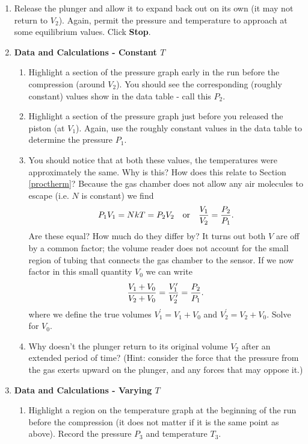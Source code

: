 \begin{enumerate}
	\item Release the plunger and allow it to expand back out on its own (it may not return to $V_{2}$).  Again, permit the pressure and temperature to approach at some equilibrium values.  Click \textbf{Stop}.
	\item \textbf{Data and Calculations - Constant $T$}
	\begin{enumerate}
		\item Highlight a section of the pressure graph early in the run before the compression (around $V_{2}$).  You should see the corresponding (roughly constant) values show in the data table - call this $P_{2}$.
		\item Highlight a section of the pressure graph just before you released the piston (at $V_{1}$).  Again, use the roughly constant values in the data table to determine the pressure $P_{1}$.
		\item You should notice that at both these values, the temperatures were approximately the same.  Why is this?  How does this relate to Section \ref{proctherm}?  Because the gas chamber does not allow any air molecules to escape (i.e. $N$ is constant) we find
		\begin{equation}
			P_{1}V_{1} = NkT = P_{2}V_{2} \textrm{\, \, or \, \,} \frac{V_{1}}{V_{2}} = \frac{P_{2}}{P_{1}} \textrm{.}
		\end{equation}
		Are these equal?  How much do they differ by?  It turns out both $V$ are off by a common factor; the volume reader does not account for the small region of tubing that connects the gas chamber to the sensor.  If we now factor in this small quantity $V_{0}$ we can write
		\begin{equation}
			\frac{V_{1}+V_{0}}{V_{2}+V_{0}} = \frac{V^{\prime}_{1}}{V^{\prime}_{2}} = \frac{P_{2}}{P_{1}} {\rm .}
		\end{equation}
		where we define the true volumes $V^{\prime}_{1}=V_{1}+V_{0}$ and $V^{\prime}_{2}=V_{2}+V_{0}$.  Solve for $V_{0}$.
		\item Why doesn't the plunger return to its original volume $V_{2}$ after an extended period of time?  (Hint: consider the force that the pressure from the gas exerts upward on the plunger, and any forces that may oppose it.)
	\end{enumerate}
	\item \textbf{Data and Calculations - Varying $T$}
	\begin{enumerate}
		\item Highlight a region on the temperature graph at the beginning of the run before the compression (it does not matter if it is the same point as above).  Record the pressure $P_{3}$ and temperature $T_{3}$.

\end{enumerate}
\end{enumerate}
